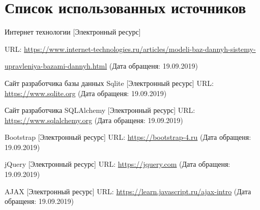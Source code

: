 \section*{Список использованных источников}

\begin{thebibliography}{3}
 Интернет технологии [Электронный ресурс] 

URL: \underline{https://www.internet-technologies.ru/articles/modeli-baz-dannyh-sistemy-}

\underline{upravleniya-bazami-dannyh.html}  (Дата обращеня: 19.09.2019)

 Сайт разработчика базы данных Sqlite [Электронный ресурс] URL: \underline{https://www.sqlite.org}  (Дата обращеня: 19.09.2019)

 Сайт разработчика SQLAlchemy [Электронный ресурс] URL: \underline{https://www.sqlalchemy.org}  (Дата обращеня: 19.09.2019)

 Bootstrap [Электронный ресурс] URL: \underline{https://bootstrap-4.ru}  (Дата обращеня: 19.09.2019)

 jQuery [Электронный ресурс] URL: \underline{https://jquery.com}  (Дата обращеня: 19.09.2019)

 AJAX [Электронный ресурс] URL: \underline{https://learn.javascript.ru/ajax-intro}  (Дата обращеня: 19.09.2019)


\end{thebibliography}